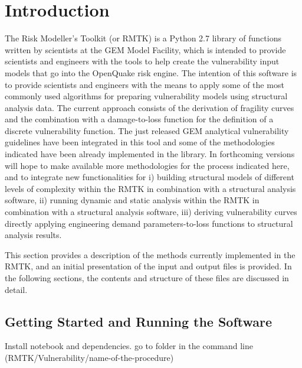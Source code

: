 \section{Introduction}
The Risk Modeller's Toolkit (or RMTK) is a Python 2.7 library of functions written by scientists at the GEM Model Facility, which is intended to provide scientists and engineers with the tools to help create the vulnerability input models that go into the OpenQuake risk engine. The intention of this software is to provide scientists and engineers with the means to apply some of the most commonly used algorithms for preparing vulnerability models using structural analysis data. The current approach consists of the derivation of fragility curves and the combination with a damage-to-loss function for the definition of a discrete vulnerability function. The just released GEM analytical vulnerability guidelines have been integrated in this tool and some of the methodologies indicated have been already implemented in the library. In forthcoming versions will hope to make available more methodologies for the process indicated here, and to integrate new functionalities for i) building structural models of different levels of complexity within the RMTK in combination with a structural analysis software, ii) running dynamic and static analysis within the RMTK in combination with a structural analysis software, iii) deriving vulnerability curves directly applying engineering demand parameters-to-loss functions to structural analysis results.

This section provides a description of the methods currently implemented in the RMTK, and an initial presentation of the input and output files is provided. In the following sections, the contents and structure of these files are discussed in detail.

\subsection{Getting Started and Running the Software}
Install notebook and dependencies. go to folder in the command line (RMTK/Vulnerability/name-of-the-procedure)